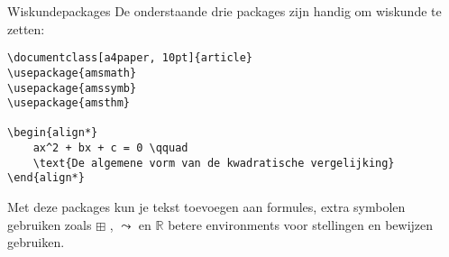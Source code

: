 \begin{frame}[fragile]{Wiskundepackages}
De onderstaande drie packages zijn handig om wiskunde te zetten:
\begin{verbatim}
\documentclass[a4paper, 10pt]{article}
\usepackage{amsmath}
\usepackage{amssymb}
\usepackage{amsthm}

\begin{align*}
    ax^2 + bx + c = 0 \qquad 
    \text{De algemene vorm van de kwadratische vergelijking} 
\end{align*}

\end{verbatim}
Met deze packages kun je tekst toevoegen aan formules, 
extra symbolen gebruiken zoals \( \boxplus \) , \( \leadsto \) en \(\mathbb{R}\) betere environments voor stellingen en bewijzen gebruiken.
\end{frame}